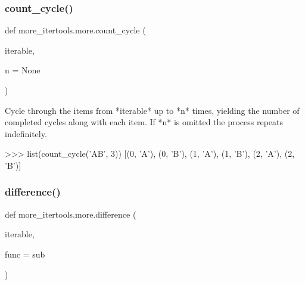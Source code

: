 \subsubsection{\texorpdfstring{count\+\_\+cycle()}{count\_cycle()}}
{\footnotesize\ttfamily def more\+\_\+itertools.\+more.\+count\+\_\+cycle (\begin{DoxyParamCaption}\item[{}]{iterable,  }\item[{}]{n = {\ttfamily None} }\end{DoxyParamCaption})}

\begin{DoxyVerb}Cycle through the items from *iterable* up to *n* times, yielding
the number of completed cycles along with each item. If *n* is omitted the
process repeats indefinitely.

>>> list(count_cycle('AB', 3))
[(0, 'A'), (0, 'B'), (1, 'A'), (1, 'B'), (2, 'A'), (2, 'B')]\end{DoxyVerb}
 \mbox{\label{namespacemore__itertools_1_1more_add926afc702bf1ee38e17059cf4d4e5b}} 
\subsubsection{\texorpdfstring{difference()}{difference()}}
{\footnotesize\ttfamily def more\+\_\+itertools.\+more.\+difference (\begin{DoxyParamCaption}\item[{}]{iterable,  }\item[{}]{func = {\ttfamily sub} }\end{DoxyParamCaption})}


